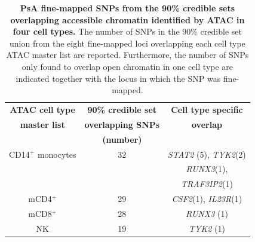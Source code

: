 \begin{table}[htbp]
\centering
\begin{tabular}{@{} c c c}
\toprule
\textbf{ATAC cell type} & \textbf{90\% credible set}   &  \textbf{Cell type specific}  \\
\textbf{master list}    & \textbf{overlapping SNPs}    &   \textbf{overlap}   \\
									      &	\textbf{(number)}				     &                            \\
\midrule
\midrule
 CD14$^+$ monocytes    & 32                            &  \textit{STAT2} (5), \textit{TYK2}(2)\\ 
                       &                               &  \textit{RUNX3}(1),\\
											 &                               &  \textit{TRAF3IP2}(1) \\
 mCD4$^+$              & 29                            &  \textit{CSF2}(1), \textit{IL23R}(1) \\
 mCD8$^+$              & 28                            &  \textit{RUNX3} (1)        \\
 NK                    & 19                            &  \textit{TYK2} (1)       \\
\bottomrule
\end{tabular}
\medskip %
\caption[PsA fine-mapped SNPs from the 90\% credible sets overlapping accessible chromatin identified by ATAC in four cell types.]{\textbf{PsA fine-mapped SNPs from the 90\% credible sets overlapping accessible chromatin identified by ATAC in four cell types.} The number of SNPs in the 90\% credible set union from the eight fine-mapped loci overlapping each cell type ATAC master list are reported. Furthermore, the number of SNPs only found to overlap open chromatin in one cell type are indicated together with the locus in which the SNP was fine-mapped.}
\label{tab:PSA_fine_mapping_ATAC_overlap}
\end{table}


